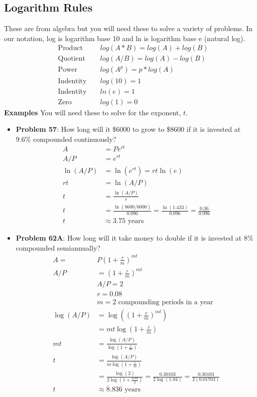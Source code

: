 \documentclass[14pt]{extarticle}
\begin{document}
\subsection{Logarithm Rules}
These are from algebra but you will need these to solve a variety of problems. In our notation, log is logarithm base 10 and ln is logarithm base e (natural log).
\begin{align*}
&\text{Product } &	&log(A * B) = log(A) + log(B) \\
&\text{Quotient } &	&log(A / B) = log(A) - log(B) \\
&\text{Power } &	&log(A^p) = p * log(A) \\
&\text{Indentity } &	&log(10) = 1 \\
&\text{Indentity } &	&ln(e) = 1 \\
&\text{Zero } &	&log(1) = 0
\end{align*}
\textbf{Examples}
You will need these to solve for the exponent, $t$.
\begin{itemize}
	\item \textbf{Problem 57}: How long will it \$6000 to grow to \$8600 if it is invested at 9.6\% compounded continuously?
	\begin{align*}
		A &= Pe^{rt} \\
		A/P &= e^{rt} \\
		\ln(A/P) &= \ln(e^{rt}) = rt \ln(e) \\
		rt &= \ln(A/P) \\
		t &= \frac{\ln(A/P)}{r} \\
		t &= \frac{\ln(8600/6000)}{0.096} = \frac{\ln(1.433)}{0.096} = \frac{0.36}{0.096} \\
		t &\approx 3.75 \text{ years}
	\end{align*}
	\item \textbf{Problem 62A}: How long will it take money to double if it is invested at $8\%$ compounded semiannually?
	\begin{align*}
		A = &P\left(1+\frac{r}{m}\right)^{mt} \\
		A/P &= \left(1+\frac{r}{m}\right)^{mt} \\
		&A/P =2 \\
		&r = 0.08 \\
		&m = 2 \text{ compounding periods in a year} \\
		\log(A/P) &= \log\left(\left(1+\frac{r}{m}\right)^{mt}\right) \\
		&= mt \log\left(1+\frac{r}{m}\right) \\
		mt &= \frac{\log(A/P)}{\log\left(1+\frac{r}{m}\right)} \\
		t &= \frac{\log(A/P)}{m\log\left(1+\frac{r}{m}\right)} \\
		&= \frac{\log(2)}{2\log\left(1+\frac{0.08}{2}\right)} = \frac{0.30103}{2\log(1.04)} = \frac{0.30103}{2(0.01703)} \\
		t &\approx 8.836 \text{ years}
	\end{align*}
\end{itemize}
\end{document}
